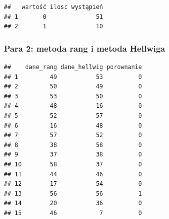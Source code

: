 \documentclass[12pt,a4paper]{report}
\begin{document}
{\begin{verbatim}
##   wartość ilosc wystąpień
## 1       0              51
## 2       1              10
\end{verbatim}

\subsubsection{Para 2: metoda rang i metoda
Hellwiga}%

\begin{Shaded}
\begin{Highlighting}[]
\NormalTok{(}\NormalTok{,}\NormalTok{)}

\NormalTok{:}
\NormalTok{\{}
  \NormalTok{\{}
  \NormalTok{\}}
\NormalTok{\}}
\NormalTok{)}
\end{Highlighting}
\end{Shaded}

\begin{verbatim}
##    dane_rang dane_hellwig porownanie
## 1         49           53          0
## 2         50           49          0
## 3         53           50          0
## 4         48           16          0
## 5         52           57          0
## 6         16           48          0
## 7         57           52          0
## 8         38           58          0
## 9         37           38          0
## 10        58           37          0
## 11        44           46          0
## 12        17           54          0
## 13        56           56          1
## 14        20           36          0
## 15        46            7          0
\end{verbatim}

\begin{Shaded}
\begin{Highlighting}[]
\NormalTok{(}
\NormalTok{(}\NormalTok{,}\NormalTok{)}
\end{Highlighting}
\end{Shaded}

}
\end{document}

